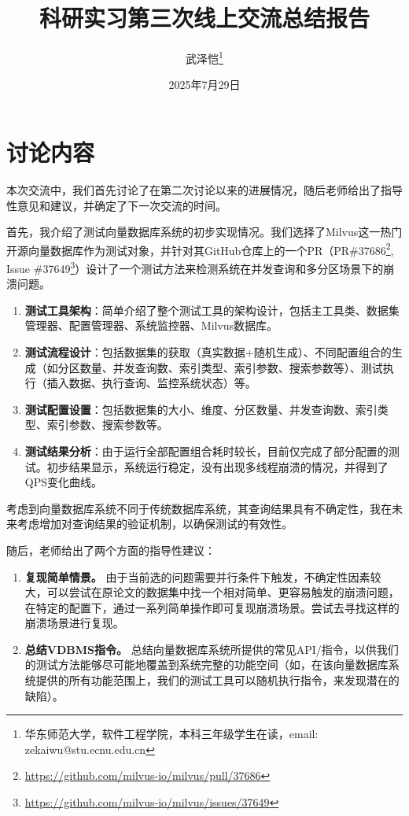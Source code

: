 \documentclass[UTF8]{ctexart}
\title{\heiti 科研实习第三次线上交流总结报告}
\author{武泽恺\footnote{华东师范大学，软件工程学院，本科三年级学生在读，email: zekaiwu@stu.ecnu.edu.cn}}
\date{2025年7月29日}
\begin{document}
\maketitle

\section{讨论内容}

本次交流中，我们首先讨论了在第二次讨论以来的进展情况，随后老师给出了指导性意见和建议，并确定了下一次交流的时间。

首先，我介绍了测试向量数据库系统的初步实现情况。我们选择了Milvus这一热门开源向量数据库作为测试对象，并针对其GitHub仓库上的一个PR（PR\#37686\footnote{\url{https://github.com/milvus-io/milvus/pull/37686}}, Issue \#37649\footnote{\url{https://github.com/milvus-io/milvus/issues/37649}}）设计了一个测试方法来检测系统在并发查询和多分区场景下的崩溃问题。

\begin{enumerate}[noitemsep, topsep=0pt]
    \item \textbf{测试工具架构}：简单介绍了整个测试工具的架构设计，包括主工具类、数据集管理器、配置管理器、系统监控器、Milvus数据库。
    \item \textbf{测试流程设计}：包括数据集的获取（真实数据+随机生成）、不同配置组合的生成（如分区数量、并发查询数、索引类型、索引参数、搜索参数等）、测试执行（插入数据、执行查询、监控系统状态）等。
    \item \textbf{测试配置设置}：包括数据集的大小、维度、分区数量、并发查询数、索引类型、索引参数、搜索参数等。
    \item \textbf{测试结果分析}：由于运行全部配置组合耗时较长，目前仅完成了部分配置的测试。初步结果显示，系统运行稳定，没有出现多线程崩溃的情况，并得到了QPS变化曲线。
\end{enumerate}

考虑到向量数据库系统不同于传统数据库系统，其查询结果具有不确定性，我在未来考虑增加对查询结果的验证机制，以确保测试的有效性。

随后，老师给出了两个方面的指导性建议：

\begin{enumerate}[noitemsep, topsep=0pt]
    \item \textbf{复现简单情景。} 由于当前选的问题需要并行条件下触发，不确定性因素较大，可以尝试在原论文的数据集中找一个相对简单、更容易触发的崩溃问题，在特定的配置下，通过一系列简单操作即可复现崩溃场景。尝试去寻找这样的崩溃场景进行复现。
    \item \textbf{总结VDBMS指令。} 总结向量数据库系统所提供的常见API/指令，以供我们的测试方法能够尽可能地覆盖到系统完整的功能空间（如，在该向量数据库系统提供的所有功能范围上，我们的测试工具可以随机执行指令，来发现潜在的缺陷）。
\end{enumerate}
\end{document}
